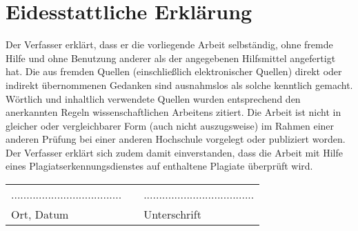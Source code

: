 \section*{Eidesstattliche Erklärung}
Der Verfasser erklärt, dass er die vorliegende Arbeit selbständig, ohne fremde Hilfe und ohne Benutzung anderer als der angegebenen Hilfsmittel angefertigt hat.
Die aus fremden Quellen (einschließlich elektronischer Quellen) direkt oder indirekt übernommenen Gedanken sind ausnahmslos als solche kenntlich gemacht.
Wörtlich und inhaltlich verwendete Quellen wurden entsprechend den anerkannten Regeln wissenschaftlichen Arbeitens zitiert.
Die Arbeit ist nicht in gleicher oder vergleichbarer Form (auch nicht auszugsweise) im Rahmen einer anderen Prüfung bei einer anderen Hochschule vorgelegt oder publiziert worden.
Der Verfasser erklärt sich zudem damit einverstanden, dass die Arbeit mit Hilfe eines Plagiatserkennungsdienstes auf enthaltene Plagiate überprüft wird.

\vspace{2cm}

\noindent
\begin{tabular}{lcl}
  .................................... & \hspace{.4\textwidth} & ....................................\\
  Ort, Datum &  & Unterschrift

\end{tabular}
